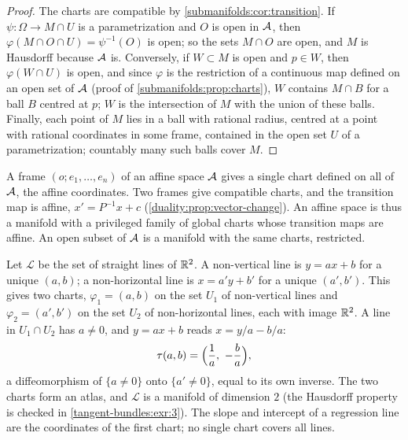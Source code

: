 \begin{notechapter}
\begin{proof}
The charts are compatible by \cref{submanifolds:cor:transition}. If
$\psi:\Omega\to M\cap U$ is a parametrization and $O$ is open in $\mathcal{A}$,
then $\varphi(M\cap O\cap U) = \psi^{-1}(O)$ is open; so the sets
$M\cap O$ are open, and $M$ is Hausdorff because $\mathcal{A}$ is. Conversely,
if $W\subset M$ is open and $p\in W$, then $\varphi(W\cap U)$ is open,
and since $\varphi$ is the restriction of a continuous map defined on an
open set of $\mathcal{A}$ (proof of \cref{submanifolds:prop:charts}), $W$
contains $M\cap B$ for a ball $B$ centred at $p$; $W$ is the intersection
of $M$ with the union of these balls. Finally, each point of $M$ lies in
a ball with rational radius, centred at a point with rational coordinates
in some frame, contained in the open set $U$ of a parametrization;
countably many such balls cover $M$.
\end{proof}

\begin{example}\label{tangent-bundles:ex:affine}
A frame $(o; e_1,\dots,e_n)$ of an affine space $\mathcal{A}$ gives a single
chart defined on all of $\mathcal{A}$, the affine coordinates. Two frames give
compatible charts, and the transition map is affine,
$x' = P^{-1}x + c$ (\cref{duality:prop:vector-change}). An affine space
is thus a manifold with a privileged family of global charts whose
transition maps are affine. An open subset of $\mathcal{A}$ is a manifold with
the same charts, restricted.
\end{example}

\begin{example}\label{tangent-bundles:ex:lines}
Let $\mathcal L$ be the set of straight lines of $\mathbb{R}^2$. A non-vertical
line is $y = ax + b$ for a unique $(a, b)$; a non-horizontal line is
$x = a'y + b'$ for a unique $(a', b')$. This gives two charts,
$\varphi_1 = (a, b)$ on the set $U_1$ of non-vertical lines and
$\varphi_2 = (a', b')$ on the set $U_2$ of non-horizontal lines, each
with image $\mathbb{R}^2$. A line in $U_1\cap U_2$ has $a\neq0$, and
$y = ax + b$ reads $x = y/a - b/a$:
\[
  \tau(a, b) = \Bigl(\frac1a,\ -\frac ba\Bigr) ,
\]
a diffeomorphism of $\{a\neq0\}$ onto $\{a'\neq0\}$, equal to its own
inverse. The two charts form an atlas, and $\mathcal L$ is a manifold of
dimension $2$ (the Hausdorff property is checked in
\cref{tangent-bundles:exr:3}). The slope and intercept of a regression
line are the coordinates of the first chart; no single chart covers all
lines.
\end{example}


\end{notechapter}
